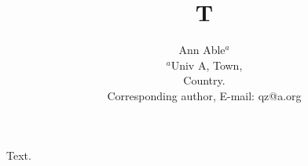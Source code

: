 \documentclass{article}
\title{T}
\author{Ann Able$^{a}$\\
{\small $^{a}$Univ A, Town,}\\
{\small Country.}\\
{\small * Corresponding author, E-mail: qz@a.org }\\
}
\date{}
\begin{document}
\maketitle
Text.
\end{document}
